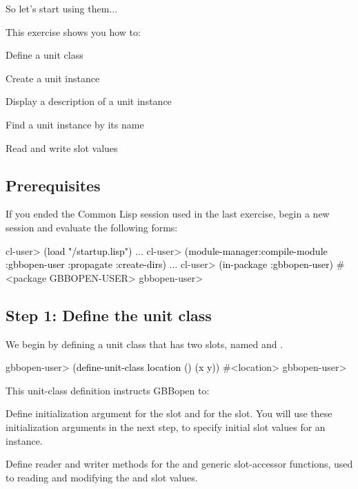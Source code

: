 \documentclass[10pt,twoside,english,pdftex]{article}
\begin{document}
So let's start using them$\ldots$

\fndocrule

This exercise shows you how to:
\begin{tightitemize}
\item Define a unit class
\item Create a unit instance
\item Display a description of a unit instance
\item Find a unit instance by its name
\item Read and write slot values
\end{tightitemize}

\fndocrule

\subsection*{Prerequisites}

%
%
If you ended the Common Lisp session used in the last exercise, begin a new
session and evaluate the following forms:
%
\W\supp
\begin{example}
\textcolor{darkergray}{%
  cl-user> \textcolor{black}{(load "/startup.lisp")}
     ...
  cl-user> \textcolor{black}{(module-manager:compile-module :gbbopen-user :propagate :create-dirs)}
     ...
  cl-user> \textcolor{black}{(in-package :gbbopen-user)}
  #<package GBBOPEN-USER>
  gbbopen-user>}
\end{example}

\subsection*{Step 1: Define the  unit class}

%
%
%
We begin by defining a unit class  that has two slots,
named  and .
%
\W\supp
\begin{example}
\textcolor{darkergray}{%
  gbbopen-user> \textcolor{black}{(define-unit-class location ()
                  (x y))}
  #<location>
  gbbopen-user>}
\end{example}

This unit-class definition instructs GBBopen to:
%
\begin{tightitemize}
\item Define initialization argument  for the  slot
  and  for the  slot.  You will use these
  initialization arguments in the next step, to specify initial slot
  values for an instance.
\item Define reader and writer methods for the  and
   generic slot-accessor functions, used to reading and
  modifying the  and  slot values.
\end{tightitemize}
\end{document}
